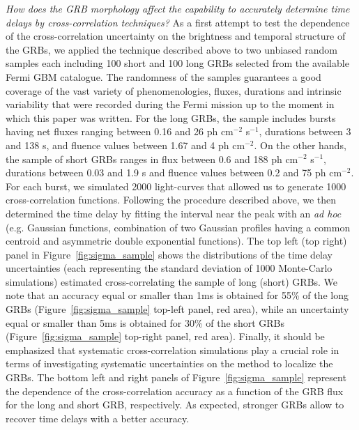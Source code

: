 \documentclass[]{spie}  %
\begin{document}
\emph{How does the GRB morphology affect the capability to accurately determine time delays by cross-correlation techniques?}
As a first attempt to test the dependence of the cross-correlation uncertainty on the brightness and temporal structure of the GRBs, we applied the technique described above to two unbiased random samples each including 100 short and 100 long GRBs selected from the available Fermi GBM catalogue.
The randomness of the samples guarantees a good coverage of the vast variety of phenomenologies, fluxes, durations and intrinsic variability that were recorded during the Fermi mission up to the moment in which this paper was written. For the long GRBs, the sample includes bursts having net fluxes ranging between 0.16 and 26 ph cm$^{-2}$ s$^{-1}$, durations between 3 and 138 s, and fluence values between 1.67 and 4 ph cm$^{-2}$. On the other hands, the sample of short GRBs ranges in flux between 0.6 and 188 ph cm$^{-2}$ s$^{-1}$, durations between 0.03 and 1.9 s and fluence values between 0.2 and 75 ph cm$^{-2}$.\\

For each burst, we simulated 2000 light-curves that allowed us to generate 1000 cross-correlation functions. Following the procedure described above, we then determined the time delay by fitting the interval near the peak with an \emph{ad hoc} (e.g. Gaussian functions, combination of two Gaussian profiles having a common centroid and asymmetric double exponential functions). The top left (top right) panel in Figure~\ref{fig:sigma_sample} shows the distributions of the time delay uncertainties (each representing the standard deviation of 1000 Monte-Carlo simulations) estimated cross-correlating the sample of long (short) GRBs. We note that an accuracy equal or smaller than 1ms is obtained for 55\% of the long GRBs (Figure~\ref{fig:sigma_sample} top-left panel, red area), while an uncertainty equal or smaller than 5ms is obtained for 30\% of the short GRBs (Figure~\ref{fig:sigma_sample} top-right panel, red area). Finally, it should be emphasized that systematic cross-correlation simulations play a crucial role in terms of investigating systematic uncertainties on the method to localize the GRBs. The bottom left and right panels of Figure~\ref{fig:sigma_sample} represent the dependence of the cross-correlation accuracy as a function of the GRB flux for the long and short GRB, respectively. As expected, stronger GRBs allow to recover time delays with a better accuracy.    
\end{document}
